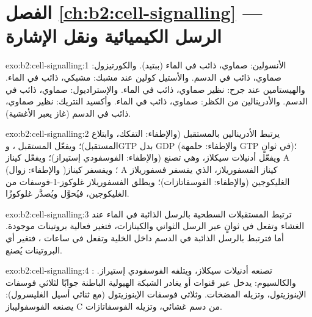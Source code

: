 \section*{الفصل \ref{ch:b2:cell-signalling} --- الرسل الكيميائية ونقل الإشارة}

\begin{solution}{exo:b2:cell-signalling:1}
الأنسولين: صماوي، ذائب في الماء (ببتيد). والكورتيزول: صماوي،
ذائب في الدسم. والأستيل كولين عند مشبك: مشبكي، ذائب في الماء.
والهيستامين عند جرح: نظير صماوي، ذائب في الماء. والإستراديول:
صماوي، ذائب في الدسم. والأدرينالين من الكظر: صماوي،
ذائب في الماء. وأكسيد النتريك: نظير صماوي، ذائب في الدسم (غاز
يعبر الأغشية).
\end{solution}

\begin{solution}{exo:b2:cell-signalling:2}
يرتبط الأدرينالين بالمستقبل (والإطفاء: التفكك، وابتلاع
المستقبل)؛ ويفعّل المستقبل ، وGTP بدل GDP (والإطفاء:
حلمهة GTP في ثوانٍ)؛ ويفعّل  أدنيلات سيكلاز،
وهي تصنع  (والإطفاء: الفوسفودي إستيراز)؛ ويفعّل  كيناز A
(والإطفاء: زوال )؛ ويفسفر كيناز A كيناز الفسفوريلاز،
الذي يفسفر فسفوريلاز الغليكوجين (والإطفاء: الفوسفاتازات)؛
ويطلق الفسفوريلاز غلوكوز-1-فوسفات من الغليكوجين، فيُحوَّل
ويُصدَّر غلوكوزًا.
\end{solution}

\begin{solution}{exo:b2:cell-signalling:3}
ترتبط المستقبلات السطحية بالرسل الذائبة في الماء عند الغشاء
وتفعل في ثوانٍ عبر الرسل الثواني والكينازات، فتغير
فعالية بروتينات موجودة. أما  فترتبط بالرسل الذائبة
في الدسم داخل الخلية وتفعل في ساعات ، فتغير أي البروتينات يُصنع.
\end{solution}

\begin{solution}{exo:b2:cell-signalling:4}
: تصنعه أدنيلات سيكلاز، ويتلفه
الفوسفودي إستيراز. والكالسيوم: يدخل عبر قنوات أو يغادر
الشبكة الهيولية الباطنة جوابًا لثلاثي فوسفات الإينوزيتول، وتزيله
المضخات. وثلاثي فوسفات الإينوزيتول (مع ثنائي أسيل الغليسرول): يصنعه
الفوسفوليباز C من دسم غشائي، وتزيله الفوسفاتازات.
\end{solution}

